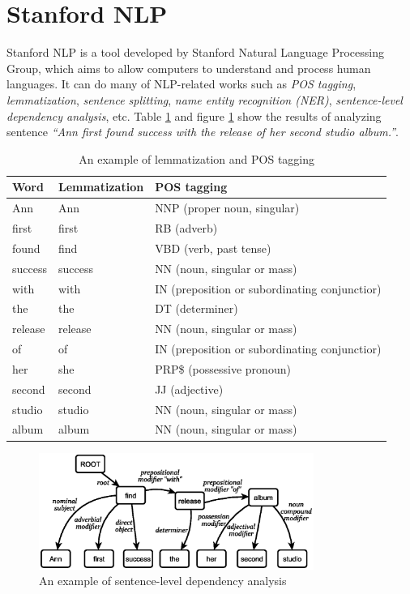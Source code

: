 \section{Stanford NLP}
Stanford NLP \cite{toutanovastanford,stanfordtoolkits} is a tool developed by Stanford Natural Language Processing Group, which aims to allow computers to understand and process human languages. It can do many of NLP-related works such as {\em POS tagging}, {\em lemmatization}, {\em sentence splitting}, {\em name entity recognition (NER)}, {\em sentence-level dependency analysis}, etc. Table \ref{tab:res} and figure \ref{fig:res} show the results of analyzing sentence {\em ``Ann first found success with the release of her second studio album.''}.
\begin{table}[!htb]
\centering
\begin{tabular}{lll}
\hline
Word & Lemmatization & POS tagging\\\hline
Ann & Ann & NNP (proper noun, singular)\\
first & first & RB (adverb)\\
found & find & VBD (verb, past tense)\\
success & success & NN (noun, singular or mass)\\
with & with & IN (preposition or subordinating conjunctior)\\
the & the & DT (determiner)\\
release & release & NN (noun, singular or mass)\\
of & of & IN (preposition or subordinating conjunctior)\\
her & she & PRP\$ (possessive pronoun)\\
second & second & JJ (adjective)\\
studio & studio & NN (noun, singular or mass)\\
album & album & NN (noun, singular or mass)\\\hline
\end{tabular}
\caption{An example of lemmatization and POS tagging}
\label{tab:res}
\end{table}

\begin{figure}
\centering
\includegraphics[width=0.8\textwidth]{figures/nlp.eps}
\caption{An example of sentence-level dependency analysis}
\label{fig:res}
\end{figure}

